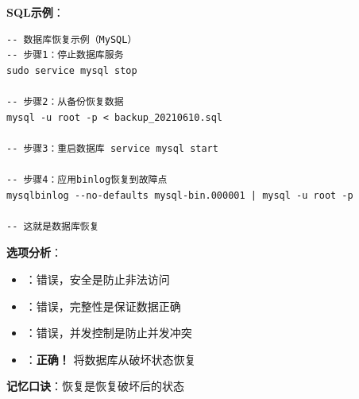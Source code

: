 \documentclass[12pt, a4paper]{article}
\newenvironment{bluebox}[1]{%
  \begin{trivlist}
  \item[\hskip\labelsep \textbf{#1}]
  \setlength{\parskip}{0.5ex}
  \setlength{\itemsep}{0.5ex}
}{%
  \end{trivlist}
  }
\begin{document}
\begin{bluebox}{例题2：数据库恢复}
	\textbf{SQL示例}：
	\begin{verbatim}
-- 数据库恢复示例（MySQL）
-- 步骤1：停止数据库服务
sudo service mysql stop

-- 步骤2：从备份恢复数据
mysql -u root -p < backup_20210610.sql

-- 步骤3：重启数据库 service mysql start

-- 步骤4：应用binlog恢复到故障点
mysqlbinlog --no-defaults mysql-bin.000001 | mysql -u root -p

-- 这就是数据库恢复
	\end{verbatim}

	\textbf{选项分析}：
	\begin{itemize}[nosep]
		\item[A) 数据库安全性控制]：错误，安全是防止非法访问
		\item[B) 数据库完整性控制]：错误，完整性是保证数据正确
		\item[C) 数据库并发控制]：错误，并发控制是防止并发冲突
		\item[D) 数据库恢复]：\textbf{正确！} 将数据库从破坏状态恢复
	\end{itemize}

	\textbf{记忆口诀}：恢复是恢复破坏后的状态
\end{bluebox}
\end{document}
